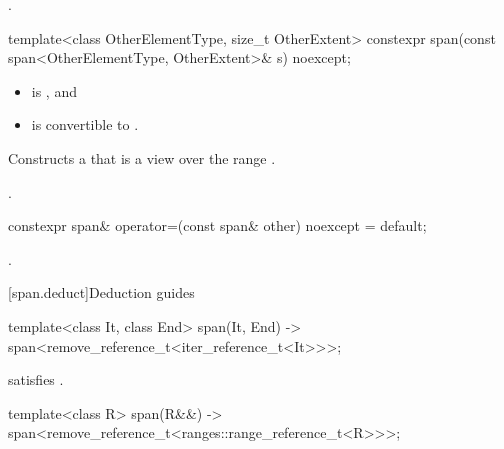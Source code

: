 \begin{itemdescr}
\pnum
\ensures
{}.
\end{itemdescr}

%
\begin{itemdecl}
template<class OtherElementType, size_t OtherExtent>
  constexpr span(const span<OtherElementType, OtherExtent>& s) noexcept;
\end{itemdecl}

\begin{itemdescr}
\pnum
\constraints
\begin{itemize}
\item {} is , and
\item {} is convertible to .
\end{itemize}

\pnum
\effects
Constructs a  that is a view over the range
.

\pnum
\ensures
{}.
\end{itemdescr}

%
\begin{itemdecl}
constexpr span& operator=(const span& other) noexcept = default;
\end{itemdecl}

\begin{itemdescr}
\pnum
\ensures
{}.
\end{itemdescr}

[span.deduct]{Deduction guides}

%
\begin{itemdecl}
template<class It, class End>
  span(It, End) -> span<remove_reference_t<iter_reference_t<It>>>;
\end{itemdecl}

\begin{itemdescr}
\pnum
\constraints
{} satisfies .
\end{itemdescr}

%
\begin{itemdecl}
template<class R>
  span(R&&) -> span<remove_reference_t<ranges::range_reference_t<R>>>;
\end{itemdecl}

